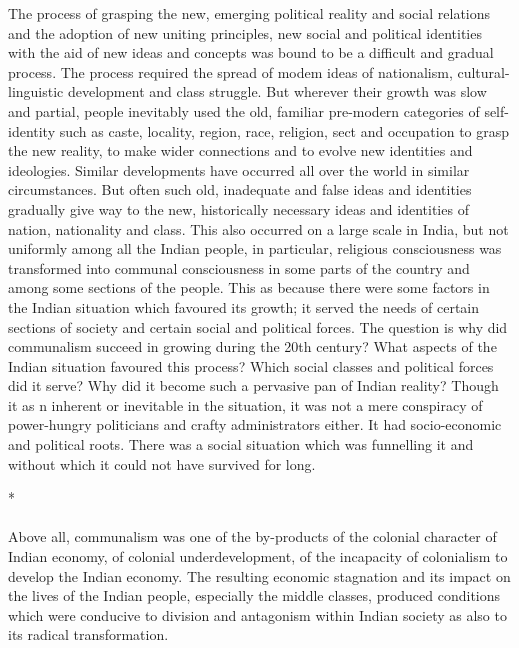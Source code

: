 \begin{multicols}{2}
The process of grasping the new, emerging political reality and social relations and the adoption of new uniting principles, new social and political identities with the aid of new ideas and concepts was bound to be a difficult and gradual process. The process required the spread of modem ideas of nationalism, cultural-linguistic development and class struggle. But wherever their growth was slow and partial, people inevitably used the old, familiar pre-modern categories of self-identity such as caste, locality, region, race, religion, sect and occupation to grasp the new reality, to make wider connections and to evolve new identities and ideologies. Similar developments have occurred all over the world in similar circumstances. But often such old, inadequate and false ideas and identities gradually give way to the new, historically necessary ideas and identities of nation, nationality and class. This also occurred on a large scale in India, but not uniformly among all the Indian people, in particular, religious consciousness was transformed into communal consciousness in some parts of the country and among some sections of the people. This as because there were some factors in the Indian situation which favoured its growth; it served the needs of certain sections of society and certain social and political forces. The question is why did communalism succeed in growing during the 20th century? What aspects of the Indian situation favoured this process? Which social classes and political forces did it serve? Why did it become such a pervasive pan of Indian reality? Though it as n inherent or inevitable in the situation, it was not a mere conspiracy of power-hungry politicians and crafty administrators either. It had socio-economic and political roots. There was a social situation which was funnelling it and without which it could not have survived for long.

\begin{center}*\end{center}

\paragraph*{}

Above all, communalism was one of the by-products of the colonial character of Indian economy, of colonial underdevelopment, of the incapacity of colonialism to develop the Indian economy. The resulting economic stagnation and its impact on the lives of the Indian people, especially the middle classes, produced conditions which were conducive to division and antagonism within Indian society as also to its radical transformation. 


\end{multicols}
